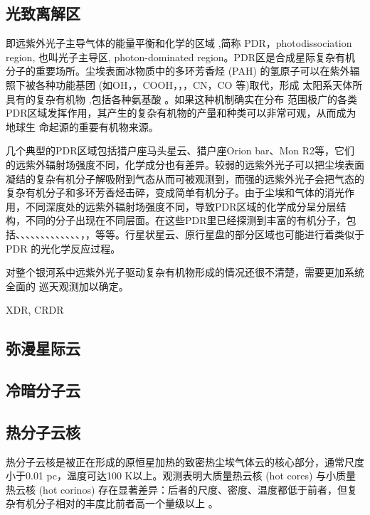 \documentclass[a4paper]{article}
\begin{document}
\subsection{光致离解区} 即远紫外光子主导气体的能量平衡和化学的区域 \citep{Tielens2005} ,简称 PDR，photodissociation region, 也叫光子主导区, photon-dominated region。PDR区是合成星际复杂有机分子的重要场所。尘埃表⾯冰物质中的多环芳香烃 (PAH) 的氢原子可以在紫外辐照下被各种功能基团 (如OH，，COOH，，，CN，CO 等)取代，形成 太阳系天体所具有的复杂有机物 \citep{Bernstein2002},包括各种氨基酸 \citep{Bernstein2002a}。如果这种机制确实在分布 范围极广的各类PDR区域发挥作用，其产生的复杂有机物的产量和种类可以非常可观，从⽽成为地球生 命起源的重要有机物来源。

几个典型的PDR区域包括猎户座马头星云、猎户座Orion bar、Mon R2等，它们的远紫外辐射场强度不同，化学成分也有差异。较弱的远紫外光子可以把尘埃表面凝结的复杂有机分子解吸附到气态从而可被观测到，而强的远紫外光子会把气态的复杂有机分子和多环芳香烃击碎，变成简单有机分子。由于尘埃和气体的消光作用，不同深度处的远紫外辐射场强度不同，导致PDR区域的化学成分呈分层结构，不同的分子出现在不同层面。在这些PDR里已经探测到丰富的有机分子，包括、、、、、、、、、、、、、，，等等。行星状星云、原行星盘的部分区域也可能进行着类似于 PDR 的光化学反应过程。

对整个银河系中远紫外光子驱动复杂有机物形成的情况还很不清楚，需要更加系统全面的 巡天观测加以确定。

XDR, CRDR

\subsection{弥漫星际云}

\subsection{冷暗分子云}

\subsection{热分子云核}

热分子云核是被正在形成的原恒星加热的致密热尘埃气体云的核心部分，通常尺度小于0.01{} pc，温度可达100 K以上。观测表明大质量热云核 (hot cores) 与小质量热云核 (hot corinos) 存在显著差异：后者的尺度、密度、温度都低于前者，但复杂有机分子相对的丰度比前者高一个量级以上 \citep{Caselli2012}。
\end{document}
